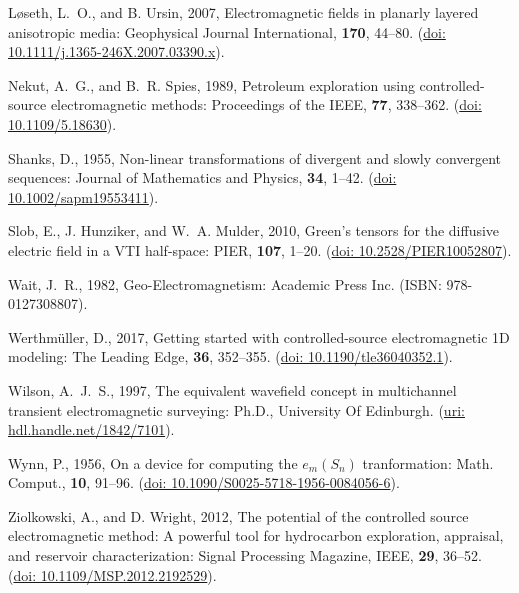 \documentclass[paper]{geophysics}
\begin{document}
\begin{thebibliography}{}
Løseth, L.~O., and B. Ursin, 2007, Electromagnetic fields in planarly layered
  anisotropic media: Geophysical Journal International, {\bf 170}, 44--80.
\newblock (\href{http://dx.doi.org/10.1111/j.1365-246X.2007.03390.x}{doi:
  10.1111/j.1365-246X.2007.03390.x}).

Nekut, A.~G., and B.~R. Spies, 1989, Petroleum exploration using
  controlled-source electromagnetic methods: Proceedings of the IEEE, {\bf 77},
  338--362.
\newblock
  (\href{http://ieeexplore.ieee.org/lpdocs/epic03/wrapper.htm?arnumber=18630}{doi:
  10.1109/5.18630}).

Shanks, D., 1955, Non-linear transformations of divergent and slowly
  convergent sequences: Journal of Mathematics and Physics, {\bf 34}, 1--42.
\newblock (\href{http://dx.doi.org/10.1002/sapm19553411}{doi:
  10.1002/sapm19553411}).

Slob, E., J. Hunziker, and W.~A. Mulder, 2010, Green's tensors for the
  diffusive electric field in a {VTI} half-space: PIER, {\bf 107}, 1--20.
\newblock (\href{http://dx.doi.org/10.2528/PIER10052807}{doi:
  10.2528/PIER10052807}).

Wait, J.~R., 1982, Geo-{E}lectromagnetism: Academic Press Inc.
\newblock ({I}SBN: 978-0127308807).

Werthmüller, D., 2017, Getting started with controlled-source electromagnetic
1D modeling: The Leading Edge, {\bf 36}, 352--355.
\newblock (\href{http://dx.doi.org/10.1190/tle36040352.1}{doi:
  10.1190/tle36040352.1}).

Wilson, A.~J.~S., 1997, The equivalent wavefield concept in multichannel
transient electromagnetic surveying: Ph.D., University Of Edinburgh.
\newblock (\href{http://hdl.handle.net/1842/7101}{uri:
hdl.handle.net/1842/7101}).

Wynn, P., 1956, {On a device for computing the $e_m(S_n)$ tranformation}:
  Math. Comput., {\bf 10}, 91--96.
\newblock (\href{http://dx.doi.org/10.1090/S0025-5718-1956-0084056-6}{doi:
  10.1090/S0025-5718-1956-0084056-6}).

Ziolkowski, A., and D. Wright, 2012, The potential of the controlled source
  electromagnetic method: A powerful tool for hydrocarbon exploration,
  appraisal, and reservoir characterization: Signal Processing Magazine, IEEE,
  {\bf 29}, 36--52.
\newblock (\href{http://dx.doi.org/10.1109/MSP.2012.2192529}{doi:
  10.1109/MSP.2012.2192529}).

\end{thebibliography}
\end{document}
